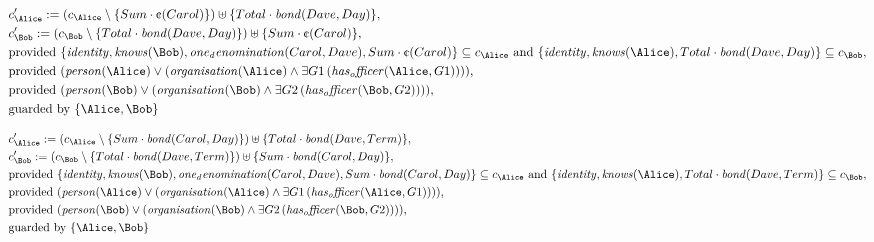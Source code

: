 \begin{align*}
&
c'_
{
\Alice
}
 := 
(c_
{
\Alice
}
 \setminus 
\{
Sum
\cdot
\text{\textcent}
(
Carol
)
\}
) \uplus 
\{
Total
\cdot
\mathit{
bond
}
(
Dave
,
Day
)
\}
,\\
&
c'_
{
\Bob
}
 := 
(c_
{
\Bob
}
 \setminus 
\{
Total
\cdot
\mathit{
bond
}
(
Dave
,
Day
)
\}
) \uplus 
\{
Sum
\cdot
\text{\textcent}
(
Carol
)
\}
,\\
&
\text{provided } 
\{
\mathit{
identity
}
,
\mathit{
knows
}
(
\Bob
)
,
\mathit{
one_denomination
}
(
Carol
,
Dave
)
,
Sum
\cdot
\text{\textcent}
(
Carol
)
\}
 \subseteq c_
{
\Alice
}
 \text{ and } 
\{
\mathit{
identity
}
,
\mathit{
knows
}
(
\Alice
)
,
Total
\cdot
\mathit{
bond
}
(
Dave
,
Day
)
\}
 \subseteq c_
{
\Bob
}
,\\
&
\text{provided } 
(
\mathit{
person
}
(
\Alice
)
\lor
(
\mathit{
organisation
}
(
\Alice
)
\land
\exists 
G1
\,(
\mathit{
has_officer
}
(
\Alice
,
G1
)
)
)
)
,\\
&
\text{provided } 
(
\mathit{
person
}
(
\Bob
)
\lor
(
\mathit{
organisation
}
(
\Bob
)
\land
\exists 
G2
\,(
\mathit{
has_officer
}
(
\Bob
,
G2
)
)
)
)
,\\
&
\text{guarded by } \{
\Alice
,
\Bob
\}
\end{align*}

\begin{align*}
&
c'_
{
\Alice
}
 := 
(c_
{
\Alice
}
 \setminus 
\{
Sum
\cdot
\mathit{
bond
}
(
Carol
,
Day
)
\}
) \uplus 
\{
Total
\cdot
\mathit{
bond
}
(
Dave
,
Term
)
\}
,\\
&
c'_
{
\Bob
}
 := 
(c_
{
\Bob
}
 \setminus 
\{
Total
\cdot
\mathit{
bond
}
(
Dave
,
Term
)
\}
) \uplus 
\{
Sum
\cdot
\mathit{
bond
}
(
Carol
,
Day
)
\}
,\\
&
\text{provided } 
\{
\mathit{
identity
}
,
\mathit{
knows
}
(
\Bob
)
,
\mathit{
one_denomination
}
(
Carol
,
Dave
)
,
Sum
\cdot
\mathit{
bond
}
(
Carol
,
Day
)
\}
 \subseteq c_
{
\Alice
}
 \text{ and } 
\{
\mathit{
identity
}
,
\mathit{
knows
}
(
\Alice
)
,
Total
\cdot
\mathit{
bond
}
(
Dave
,
Term
)
\}
 \subseteq c_
{
\Bob
}
,\\
&
\text{provided } 
(
\mathit{
person
}
(
\Alice
)
\lor
(
\mathit{
organisation
}
(
\Alice
)
\land
\exists 
G1
\,(
\mathit{
has_officer
}
(
\Alice
,
G1
)
)
)
)
,\\
&
\text{provided } 
(
\mathit{
person
}
(
\Bob
)
\lor
(
\mathit{
organisation
}
(
\Bob
)
\land
\exists 
G2
\,(
\mathit{
has_officer
}
(
\Bob
,
G2
)
)
)
)
,\\
&
\text{guarded by } \{
\Alice
,
\Bob
\}
\end{align*}

